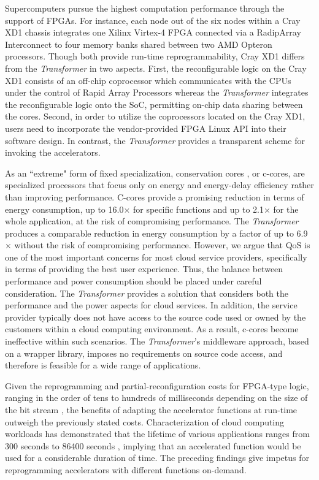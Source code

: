 Supercomputers pursue the highest computation performance
\cite{Ulmer:2005vh} through the support of FPGAs. For instance, each node
 out of the six nodes within a Cray XD1 chassis integrates one Xilinx Virtex-4 FPGA
connected via a RadipArray Interconnect to four memory banks shared
between two AMD Opteron processors. Though both provide run-time
reprogrammability, Cray XD1 differs from the {\em Transformer} in two
aspects.
First, the reconfigurable logic on the Cray XD1 consists of an off-chip
coprocessor which communicates with the CPUs under the control of Rapid
Array Processors whereas the {\em Transformer} integrates the reconfigurable
logic onto the SoC, permitting on-chip data sharing between the cores.
Second, in order to utilize the coprocessors located on the Cray XD1, users need to incorporate the
vendor-provided FPGA Linux API into their software design. In
contrast, the {\em Transformer} provides a transparent scheme for invoking
the accelerators.

As an ``extreme" form of fixed specialization, conservation cores
\cite{Venkatesh:2010:CCR:1735970.1736044,Venkatesh:2010:CCR:1736020.1736044,Venkatesh:2010:CCR:1735971.1736044},
or c-cores, are specialized processors that focus only on energy and
energy-delay efficiency rather than improving performance. C-cores
provide a promising reduction in terms of energy consumption, up to
16.0$\times$ for specific functions and up to 2.1$\times$ for the whole
application, at the risk of compromising performance.  The {\em Transformer} produces a comparable reduction in energy
consumption by a factor of up to 6.9$\times$ without the risk of compromising performance. 
However, we argue that QoS is one of the most important
concerns for most cloud service providers, specifically in terms of providing
the best user experience. Thus, the balance between performance and
power consumption should be placed under careful consideration. The {\em Transformer}
provides a solution that considers both the performance and the power aspects
for cloud services. In addition, the service provider typically does
not have access to the source code used or owned by the customers within a
cloud computing environment. As a result, c-cores become ineffective within such scenarios. The {\em Transformer}'s middleware approach, based on a wrapper library, imposes no requirements on source code access, and therefore is feasible for a wide range of applications. 

Given the reprogramming and partial-reconfiguration costs for FPGA-type
logic, ranging in the order of tens to hundreds of milliseconds depending on
the size of the bit stream \cite{Liu:2009ie}, the benefits of adapting
the accelerator functions at run-time outweigh the previously stated
costs. Characterization of cloud computing workloads has demonstrated that the lifetime of various
applications ranges from 300 seconds to 86400 seconds \cite{CloudWorkload}, implying that an
accelerated function would be used for a considerable duration of time. The preceding findings give impetus
for reprogramming accelerators with different
functions on-demand.

